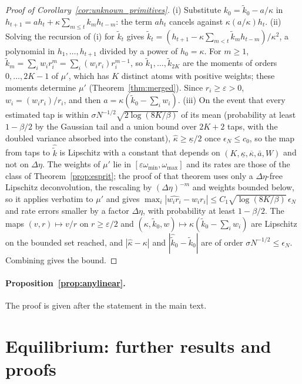 \documentclass[12pt]{article}
\theoremstyle{definition}
\theoremstyle{remark}
\begin{document}
\begin{proof}[Proof of Corollary~\ref{cor:unknown_primitives}]
(i) Substitute $k_0=\tilde k_0-a/\kappa$ in $h_{t+1}=ah_t+\kappa\sum_{m\le t}k_mh_{t-m}$: the term $ah_t$ cancels against $\kappa(a/\kappa)h_t$. (ii) Solving the recursion of (i) for $\tilde k_t$ gives $\tilde k_t=(h_{t+1}-\kappa\sum_{m<t}\tilde k_mh_{t-m})/\kappa^2$, a polynomial in $h_1,\ldots,h_{t+1}$ divided by a power of $h_0=\kappa$. For $m\ge1$, $\tilde k_m=\sum_iw_ir_i^m=\sum_i(w_ir_i)r_i^{m-1}$, so $\tilde k_1,\ldots,\tilde k_{2K}$ are the moments of orders $0,\ldots,2K-1$ of $\mu'$, which has $K$ distinct atoms with positive weights; these moments determine $\mu'$ (Theorem~\ref{thm:merged}). Since $r_i\ge\varepsilon>0$, $w_i=(w_ir_i)/r_i$, and then $a=\kappa(\tilde k_0-\sum_iw_i)$. (iii) On the event that every estimated tap is within $\sigma N^{-1/2}\sqrt{2\log(8K/\beta)}$ of its mean (probability at least $1-\beta/2$ by the Gaussian tail and a union bound over $2K+2$ taps, with the doubled variance absorbed into the constant), $\hat\kappa\ge\underline\kappa/2$ once $\epsilon_N\le c_0$, so the map from taps to $\hat{\tilde k}$ is Lipschitz with a constant that depends on $(K,\underline\kappa,\overline\kappa,\bar a,W)$ and not on $\Delta\eta$. The weights of $\mu'$ lie in $[\varepsilon\omega_{\min},\omega_{\max}]$ and its rates are those of the class of Theorem~\ref{prop:esprit}; the proof of that theorem uses only a $\Delta\eta$-free Lipschitz deconvolution, the rescaling by $(\Delta\eta)^{-m}$ and weights bounded below, so it applies verbatim to $\mu'$ and gives $\max_i|\widehat{w_ir_i}-w_ir_i|\le C_1\sqrt{\log(8K/\beta)}\,\epsilon_N$ and rate errors smaller by a factor $\Delta\eta$, with probability at least $1-\beta/2$. The maps $(v,r)\mapsto v/r$ on $r\ge\varepsilon/2$ and $(\kappa,\tilde k_0,w)\mapsto\kappa(\tilde k_0-\sum_iw_i)$ are Lipschitz on the bounded set reached, and $|\hat\kappa-\kappa|$ and $|\hat{\tilde k}_0-\tilde k_0|$ are of order $\sigma N^{-1/2}\le\epsilon_N$. Combining gives the bound.
\end{proof}
\paragraph{Proposition~\ref{prop:anylinear}.} The proof is given after the statement in the main text.

\section{Equilibrium: further results and proofs}\label{app:eqinv}
\end{document}
